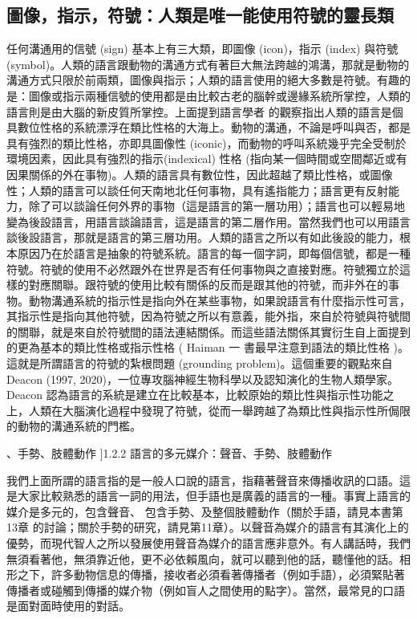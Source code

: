 \subsection{圖像，指示，符號：人類是唯一能使用符號的靈長類} %

任何溝通用的信號 (sign) 基本上有三大類，即圖像 (icon)，指示 (index) 與符號 (symbol)。人類的語言跟動物的溝通方式有著巨大無法跨越的鴻溝，那就是動物的溝通方式只限於前兩類，圖像與指示；人類的語言使用的絕大多數是符號。有趣的是：圖像或指示兩種信號的使用都是由比較古老的腦幹或邊緣系統所掌控，人類的語言則是由大腦的新皮質所掌控。上面提到語言學者 \citet{Bolinger1968} 的觀察指出人類的語言是個具數位性格的系統漂浮在類比性格的大海上。動物的溝通，不論是呼叫與否，都是具有強烈的類比性格，亦即具圖像性 (iconic)，而動物的呼叫系統幾乎完全受制於環境因素，因此具有強烈的指示(indexical) 性格 (指向某一個時間或空間鄰近或有因果關係的外在事物)。人類的語言具有數位性，因此超越了類比性格，或圖像性；人類的語言可以談任何天南地北任何事物，具有遙指能力；語言更有反射能力，除了可以談論任何外界的事物（這是語言的第一層功用）；語言也可以輕易地變為後設語言，用語言談論語言，這是語言的第二層作用。當然我們也可以用語言談後設語言，那就是語言的第三層功用。人類的語言之所以有如此後設的能力，根本原因乃在於語言是抽象的符號系統。語言的每一個字詞，即每個信號，都是一種符號。符號的使用不必然跟外在世界是否有任何事物與之直接對應。符號獨立於這樣的對應關聯。跟符號的使用比較有關係的反而是跟其他的符號，而非外在的事物。動物溝通系統的指示性是指向外在某些事物，如果說語言有什麼指示性可言，其指示性是指向其他符號，因為符號之所以有意義，能外指，來自於符號與符號間的關聯，就是來自於符號間的語法連結關係。而這些語法關係其實衍生自上面提到的更為基本的類比性格或指示性格 ( Haiman 一 書最早注意到語法的類比性格 )。 這就是所謂語言的符號的紮根問題 (grounding problem)。這個重要的觀點來自 Deacon (1997, 2020)，一位專攻腦神經生物科學以及認知演化的生物人類學家。Deacon 認為語言的系統是建立在比較基本，比較原始的類比性與指示性功能之上，人類在大腦演化過程中發現了符號，從而一舉跨越了為類比性與指示性所侷限的動物的溝通系統的門檻。

、手勢、肢體動作  ]{1.2.2 語言的多元媒介：聲音、手勢、肢體動作} 

我們上面所謂的語言指的是一般人口說的語言，指藉著聲音來傳播收訊的口語。這是大家比較熟悉的語言一詞的用法，但手語也是廣義的語言的一種。事實上語言的媒介是多元的，包含聲音、 包含手勢、及整個肢體動作（關於手語，請見本書第13章 的討論；關於手勢的研究，請見第11章）。以聲音為媒介的語言有其演化上的優勢，而現代智人之所以發展使用聲音為媒介的語言應非意外。有人講話時，我們無須看著他，無須靠近他，更不必依賴風向，就可以聽到他的話，聽懂他的話。相形之下，許多動物信息的傳播，接收者必須看著傳播者（例如手語），必須緊貼著傳播者或碰觸到傳播的媒介物（例如盲人之間使用的點字）。當然，最常見的口語是面對面時使用的對話。 


